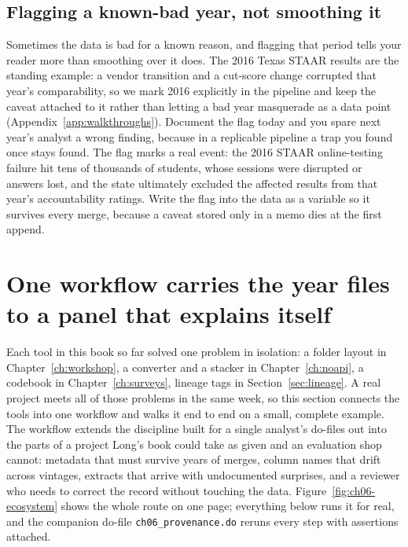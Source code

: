 \documentclass[
    a4paper,
    fontsize=10pt,
    twoside=true,
    numbers=noenddot,
]{kaobook}
\begin{document}
\subsection{Flagging a known-bad year, not smoothing it}\label{sec:ch06-pollutedyear}
Sometimes the data is bad for a known reason, and flagging that period tells your reader more than smoothing over it does. The 2016 Texas STAAR results are the standing example: a vendor transition and a cut-score change corrupted that year's comparability, so we mark 2016 explicitly in the pipeline and keep the caveat attached to it rather than letting a bad year masquerade as a data point (Appendix~\ref{app:walkthroughs}). Document the flag today and you spare next year's analyst a wrong finding, because in a replicable pipeline a trap you found once stays found. The flag marks a real event: the 2016 STAAR online-testing failure hit tens of thousands of students, whose sessions were disrupted or answers lost, and the state ultimately excluded the affected results from that year's accountability ratings. Write the flag into the data as a variable so it survives every merge, because a caveat stored only in a memo dies at the first append.

\section{One workflow carries the year files to a panel that explains itself}\label{sec:ch06-ecosystem}
Each tool in this book so far solved one problem in isolation: a folder layout in Chapter~\ref{ch:workshop}, a converter and a stacker in Chapter~\ref{ch:noapi}, a codebook in Chapter~\ref{ch:surveys}, lineage tags in Section~\ref{sec:lineage}. A real project meets all of those problems in the same week, so this section connects the tools into one workflow and walks it end to end on a small, complete example. The workflow extends the discipline \textcite{long2009workflow} built for a single analyst's do-files out into the parts of a project Long's book could take as given and an evaluation shop cannot: metadata that must survive years of merges, column names that drift across vintages, extracts that arrive with undocumented surprises, and a reviewer who needs to correct the record without touching the data. Figure~\ref{fig:ch06-ecosystem} shows the whole route on one page; everything below runs it for real, and the companion do-file \texttt{ch06\_provenance.do} reruns every step with assertions attached.
\end{document}

